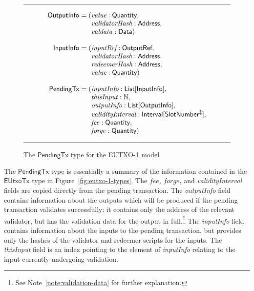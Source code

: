 \documentclass[a4paper]{article}
\newcounter{note}
\renewcommand{\i}{\textit}  %
\newcommand{\s}{\textsf}  %
\newenvironment{arraydefs}[1]{\setlength{\arraycolsep}{0pt}\begin{array}{#1}}{\end{array}}
\newcommand\rfskip{7pt}
\newenvironment{ruledfigure}[1]{\begin{figure}[#1]\hrule\vspace{\rfskip}}{\vspace{\rfskip}\hrule\end{figure}}
\newcommand{\List}[1]{\ensuremath{\s{List}[#1]}}
\newcommand{\Interval}[1]{\ensuremath{\s{Interval}[#1]}}
\newcommand{\extended}[1]{#1^\updownarrow}
\newcommand{\ptx}{\ensuremath{\s{PendingTx}}}
\newcommand{\mi}[1]{\ensuremath{\mathit{#1}}}
\newcommand{\forge}{\mi{forge}}
\newcommand{\fee}{\mi{fee}}
\newcommand{\valdata}{\mi{valdata}}
\newcommand{\Data}{\ensuremath{\mathsf{Data}}}
\newcommand{\msf}[1]{\ensuremath{\mathsf{#1}}}
\newcommand{\slotnum}{\msf{SlotNumber}}
\newcommand{\eutxotx}{\msf{EUtxoTx}}
\newcommand{\qty}{\ensuremath{\s{Quantity}}}
\newcommand\N{\ensuremath{\mathbb{N}}}
\begin{document}
\begin{ruledfigure}{H}
  \[
  \begin{arraydefs}{rll}

    \s{OutputInfo } &= (& \i{value}: \qty,\\
    && \i{validatorHash}: \s{Address},\\
    &&  \valdata: \Data)\\
    \\
    \s{InputInfo } & = (&\i{inputRef}: \s{OutputRef},\\
                 && \i{validatorHash}: \s{Address},\\
                 && \i{redeemerHash}: \s{Address},\\
                 && \i{value}: \qty)\\
     \\
     \ptx\s{ } &= (&\i{inputInfo}: \List{\s{InputInfo}},\\
     &&\i{thisInput}: \N,\\
     &&\i{outputInfo}: \List{\s{OutputInfo}},\\
     &&\i{validityInterval}: \Interval{\extended{\slotnum}},\\
     && \fee: \qty,\\
     &&\forge: \qty)
   \end{arraydefs}
 \]
  \caption{The \ptx{} type for the EUTXO-1 model}
  \label{fig:ptx-1-types}
\end{ruledfigure}
\noindent The \ptx{} type is essentially a summary of the information
contained in the $\eutxotx$ type in
Figure~\ref{fig:eutxo-1-types}. The \fee{}, \forge{}, and
\i{validityInterval} fields are copied directly from the pending
transaction.  The \i{outputInfo} field contains information about the
outputs which will be produced if the pending transaction validates
successfully: it contains only the address of the relevant validator,
but has the validation data for the output in full.\footnote{See
  Note~\ref{note:validation-data} for further explanation.}
The \i{inputInfo} field contains information about the
inputs to the pending transaction, but provides only the hashes of the
validator and redeemer scripts for the inputs.  The \i{thisInput}
field is an index pointing to the element of \i{inputInfo}
relating to the input currently undergoing validation.
\end{document}
